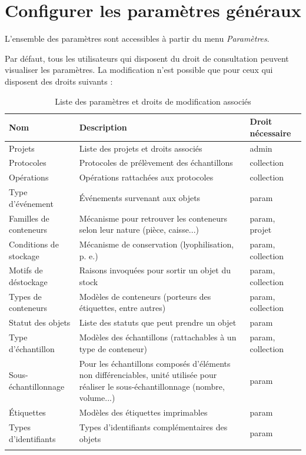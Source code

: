 \section{Configurer les paramètres généraux}
\label{param}
L'ensemble des paramètres sont accessibles à partir du menu \textit{Paramètres}. 

Par défaut, tous les utilisateurs qui disposent du droit de consultation peuvent visualiser les paramètres. La modification n'est possible que pour ceux qui disposent des droits suivants :

\begin{longtable}{|p{4cm}|p{8cm}| p{3cm}|}
\hline
\textbf{Nom} & \textbf{Description} & \textbf{Droit nécessaire} \\
\hline
\endhead
Projets & Liste des projets et droits associés & admin \\
\hline
Protocoles & Protocoles de prélèvement des échantillons & collection \\
\hline
Opérations & Opérations rattachées aux protocoles & collection \\
\hline
Type d'événement & Événements survenant aux objets & param \\
\hline
Familles de conteneurs & Mécanisme pour retrouver les conteneurs selon leur nature (pièce, caisse...) & param, projet\\
\hline
Conditions de stockage & Mécanisme de conservation (lyophilisation, p. e.) & param, collection\\
\hline
Motifs de déstockage & Raisons invoquées pour sortir un objet du stock & param, collection\\
\hline
Types de conteneurs & Modèles de conteneurs (porteurs des étiquettes, entre autres) & param, collection\\
\hline
Statut des objets & Liste des statuts que peut prendre un objet & param\\
\hline
Type d'échantillon & Modèles des échantillons (rattachables à un type de conteneur) &  param, collection\\
\hline
Sous-échantillonnage & Pour les échantillons composés d'éléments non différenciables, unité utilisée pour réaliser le sous-échantillonnage (nombre, volume...) & param \\
\hline
Étiquettes & Modèles des étiquettes imprimables & param \\
\hline
Types d'identifiants & Types d'identifiants complémentaires des objets & param \\
\hline

\caption{Liste des paramètres et droits de modification associés}
\end{longtable}

